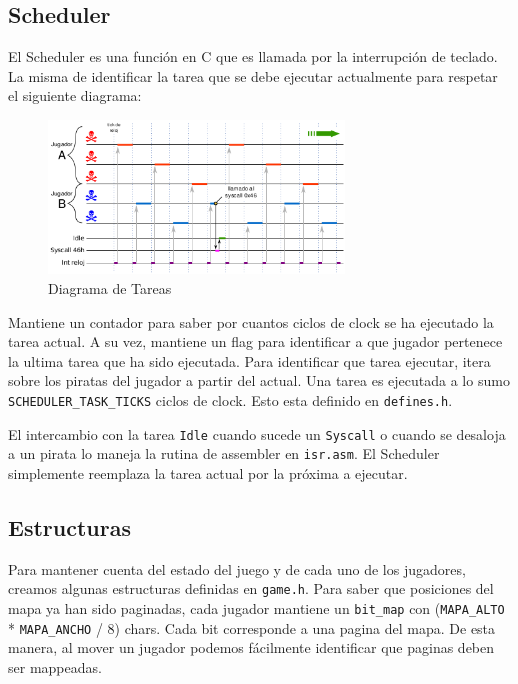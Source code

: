 \pagebreak

\subsection{Scheduler}

El Scheduler es una función en C que es llamada por la interrupción de teclado. La misma de identificar la tarea que se debe ejecutar actualmente para respetar el siguiente diagrama:

\begin{figure}[H]
  \centering
    \includegraphics[width=0.7\textwidth]{images/scheduler}
  \caption{Diagrama de Tareas}
\end{figure}

Mantiene un contador para saber por cuantos ciclos de clock se ha ejecutado la tarea actual. A su vez, mantiene un flag para identificar a que jugador pertenece la ultima tarea que ha sido ejecutada. Para identificar que tarea ejecutar, itera sobre los piratas del jugador a partir del actual. Una tarea es ejecutada a lo sumo \texttt{SCHEDULER\_TASK\_TICKS} ciclos de clock. Esto esta definido en \texttt{defines.h}.

El intercambio con la tarea \texttt{Idle} cuando sucede un \texttt{Syscall} o cuando se desaloja a un pirata lo maneja la rutina de assembler en \texttt{isr.asm}. El Scheduler simplemente reemplaza la tarea actual por la próxima a ejecutar.

\subsection{Estructuras}

Para mantener cuenta del estado del juego y de cada uno de los jugadores, creamos algunas estructuras definidas en \texttt{game.h}. Para saber que posiciones del mapa ya han sido paginadas, cada jugador mantiene un \texttt{bit\_map} con (\texttt{MAPA\_ALTO} * \texttt{MAPA\_ANCHO} / 8) chars. Cada bit corresponde a una pagina del mapa. De esta manera, al mover un jugador podemos fácilmente identificar que paginas deben ser mappeadas.

